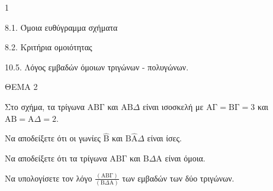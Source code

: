 \begin{ylh}{1}
    \item 8.1. Όμοια ευθύγραμμα σχήματα
    \item 8.2. Κριτήρια ομοιότητας
    \item 10.5. Λόγος εμβαδών όμοιων τριγώνων - πολυγώνων.
\end{ylh}
\begin{figure} %
    \centering
\end{figure}

ΘΕΜΑ 2

Στο σχήμα, τα τρίγωνα $\text{ΑΒΓ}$ και $\text{ΑΒ}\Delta$ είναι ισοσκελή με $\text{ΑΓ} = \text{ΒΓ} = 3$ και $\text{ΑΒ} = \text{Α}\Delta = 2$.
\begin{alist}
    \item Να αποδείξετε ότι οι γωνίες $\hat{\text{B}}$ και $\text{B}\hat{\text{A}}\Delta$ είναι ίσες. 
    \item Να αποδείξετε ότι τα τρίγωνα $\text{ΑΒΓ}$ και $\text{Β}\Delta\text{Α}$ είναι όμοια. 
    \item Να υπολογίσετε τον λόγο $\frac{(\text{ΑΒΓ})}{(\text{Β}\Delta\text{Α})}$ των εμβαδών των δύο τριγώνων. 
\end{alist}